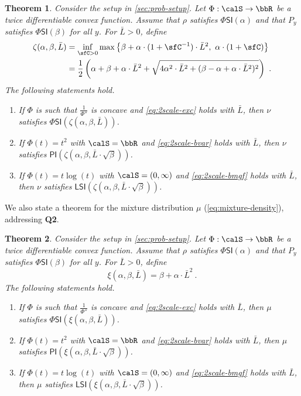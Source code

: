 \documentclass[11pt]{article}
\newtheorem{theorem}{Theorem}[section]
\newcounter{ct}
\newcommand{\PI}[1]{\mathsf{PI}\left(#1\right)}
\newcommand{\LSI}[1]{\mathsf{LSI}\left(#1\right)}
\newcommand{\PhiSI}[1]{\Phi\mathsf{SI}\left(#1\right)}
\begin{document}
\begin{theorem}
\label{thm:Phi-general-joint}
Consider the setup in \cref{sec:prob-setup}.
Let \(\Phi : \calS \to \bbR\) be a twice differentiable convex function.
Assume that \(\rho\) satisfies \(\PhiSI{\alpha}\) and that \(P_{y}\) satisfies \(\PhiSI{\beta}\) for all \(y\).
For \(\bar{L} > 0\), define
\begin{align*}
    \zeta(\alpha, \beta, \bar{L}) &= \inf_{\sfC > 0} \max\left\{\beta + \alpha \cdot (1 + \sfC^{-1}) \cdot \bar{L}^{2},~\alpha \cdot (1 + \sfC)\right\} \\
    &= \frac{1}{2}\left(\alpha + \beta + \alpha \cdot \bar{L}^{2} + \sqrt{4\alpha^{2} \cdot \bar{L}^{2} + (\beta - \alpha + \alpha \cdot \bar{L}^{2})^{2}}\right)~.
\end{align*}
The following statements hold.
\begin{enumerate}[leftmargin=*]
    \item If \(\Phi\) is such that \(\frac{1}{\Phi''}\) is concave and \ref{eq:2scale-exc} holds with \(\bar{L}\), then \(\nu\) satisfies \(\PhiSI{\zeta(\alpha, \beta, \bar{L})}\).
    \item If \(\Phi(t) = t^{2}\) with \(\calS = \bbR\) and \ref{eq:2scale-bvar} holds with \(\bar{L}\), then \(\nu\) satisfies \(\PI{\zeta(\alpha, \beta, \bar{L} \cdot \sqrt{\beta})}\).
    \item If \(\Phi(t) = t\log(t)\) with \(\calS = (0, \infty)\) and \ref{eq:2scale-bmgf} holds with \(\bar{L}\), then \(\nu\) satisfies \(\LSI{\zeta(\alpha, \beta, \bar{L} \cdot \sqrt{\beta})}\).
\end{enumerate}
\end{theorem}

We also state a theorem for the mixture distribution \(\mu\) (\cref{eq:mixture-density}), addressing \textbf{Q2}.

\begin{theorem}
\label{thm:Phi-general-mixture}
Consider the setup in \cref{sec:prob-setup}.
Let \(\Phi : \calS \to \bbR\) be a twice differentiable convex function.
Assume that \(\rho\) satisfies \(\PhiSI{\alpha}\) and that \(P_{y}\) satisfies \(\PhiSI{\beta}\) for all \(y\).
For \(\bar{L} > 0\), define
\begin{equation*}
    \xi(\alpha, \beta, \bar{L}) = \beta + \alpha \cdot \bar{L}^{2}~.
\end{equation*}
The following statements hold.
\begin{enumerate}[leftmargin=*]
    \item If \(\Phi\) is such that \(\frac{1}{\Phi''}\) is concave and \ref{eq:2scale-exc} holds with \(\bar{L}\), then \(\mu\) satisfies \(\PhiSI{\xi(\alpha, \beta, \bar{L})}\).
    \item If \(\Phi(t) = t^{2}\) with \(\calS = \bbR\) and \ref{eq:2scale-bvar} holds with \(\bar{L}\), then \(\mu\) satisfies \(\PI{\xi(\alpha, \beta, \bar{L} \cdot \sqrt{\beta})}\).
    \item If \(\Phi(t) = t\log(t)\) with \(\calS = (0, \infty)\) and \ref{eq:2scale-bmgf} holds with \(\bar{L}\), then \(\mu\) satisfies \(\LSI{\xi(\alpha, \beta, \bar{L} \cdot \sqrt{\beta})}\).
\end{enumerate}
\end{theorem}
\end{document}
